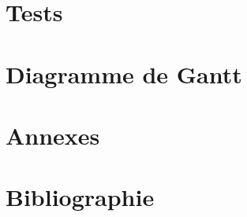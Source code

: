 \documentclass[a4paper]{article}
\begin{document}
\section{Tests}

\section{Diagramme de Gantt}

\section{Annexes}


\section{Bibliographie}




\end{document}
